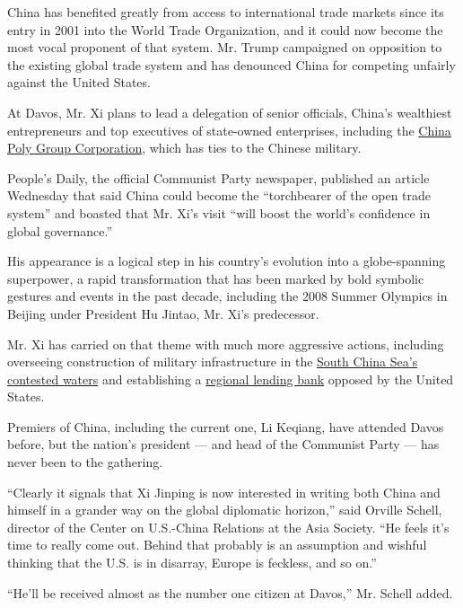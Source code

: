 China has benefited greatly from access to international trade markets
since its entry in 2001 into the World Trade Organization, and it could
now become the most vocal proponent of that system. Mr. Trump campaigned
on opposition to the existing global trade system and has denounced
China for competing unfairly against the United States.

At Davos, Mr. Xi plans to lead a delegation of senior officials, China's
wealthiest entrepreneurs and top executives of state-owned enterprises,
including the \href{http://www.poly.com.cn/english/1627.html}{China Poly
Group Corporation}, which has ties to the Chinese military.

People's Daily, the official Communist Party newspaper, published an
article Wednesday that said China could become the ``torchbearer of the
open trade system'' and boasted that Mr. Xi's visit ``will boost the
world's confidence in global governance.''

His appearance is a logical step in his country's evolution into a
globe-spanning superpower, a rapid transformation that has been marked
by bold symbolic gestures and events in the past decade, including the
2008 Summer Olympics in Beijing under President Hu Jintao, Mr. Xi's
predecessor.

Mr. Xi has carried on that theme with much more aggressive actions,
including overseeing construction of military infrastructure in the
\href{https://www.nytimes3xbfgragh.onion/2016/12/27/world/asia/south-china-sea-trump.html}{South
China Sea's contested waters} and establishing a
\href{https://www.nytimes3xbfgragh.onion/2015/12/05/business/international/china-creates-an-asian-bank-as-the-us-stands-aloof.html}{regional
lending bank} opposed by the United States.

Premiers of China, including the current one, Li Keqiang, have attended
Davos before, but the nation's president --- and head of the Communist
Party --- has never been to the gathering.

``Clearly it signals that Xi Jinping is now interested in writing both
China and himself in a grander way on the global diplomatic horizon,''
said Orville Schell, director of the Center on U.S.-China Relations at
the Asia Society. ``He feels it's time to really come out. Behind that
probably is an assumption and wishful thinking that the U.S. is in
disarray, Europe is feckless, and so on.''

``He'll be received almost as the number one citizen at Davos,'' Mr.
Schell added.

